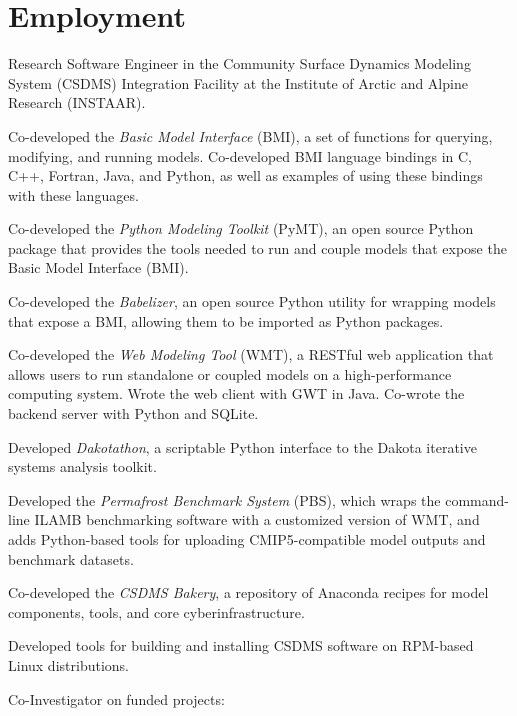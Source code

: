 \section{Employment}
\vspace{0.5em}

\begin{compactitem}[\itembullet]
  \item
    Research Software Engineer in the Community
    Surface Dynamics Modeling System (CSDMS) Integration Facility at
    the Institute of Arctic and Alpine Research (INSTAAR).
  \item
    Co-developed the \textit{Basic Model Interface} (BMI), a set of functions
    for querying, modifying, and running models. Co-developed BMI language
    bindings in C, C++, Fortran, Java, and Python, as well as examples of using
    these bindings with these languages.
  \item
    Co-developed the \textit{Python Modeling Toolkit} (PyMT), an
    open source Python package that provides the tools needed to run
    and couple models that expose the Basic Model Interface (BMI).
  \item
    Co-developed the \textit{Babelizer}, an open source Python utility for
    wrapping models that expose a BMI, allowing them to be imported as Python
    packages.
  \item
    Co-developed the \textit{Web Modeling Tool} (WMT), a RESTful
    web application that allows users to run standalone or coupled
    models on a high-performance computing system. Wrote the web
    client with GWT in Java. Co-wrote the backend server with Python
    and SQLite.
  \item
    Developed \textit{Dakotathon}, a scriptable Python interface to
    the Dakota iterative systems analysis toolkit.
  \item    
    Developed the \textit{Permafrost Benchmark System} (PBS), which
    wraps the command-line ILAMB benchmarking software with a
    customized version of WMT, and adds Python-based tools for
    uploading CMIP5-compatible model outputs and benchmark datasets.
  \item
    Co-developed the \textit{CSDMS Bakery}, a repository of Anaconda recipes
    for model components, tools, and core cyberinfrastructure.
  \item
    Developed tools for building and installing CSDMS software on
    RPM-based Linux distributions.
  \item Co-Investigator on funded projects:

\end{compactitem}
